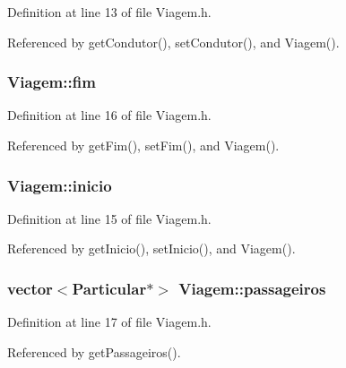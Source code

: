 Definition at line 13 of file Viagem.\+h.



Referenced by get\+Condutor(), set\+Condutor(), and Viagem().

\hypertarget{class_viagem_ab54e61d41be0157f9e75b14c8e06137f}{
\subsubsection[{fim}]{ Viagem\+::fim\hspace{0.3cm}{\ttfamily [private]}}}\label{class_viagem_ab54e61d41be0157f9e75b14c8e06137f}


Definition at line 16 of file Viagem.\+h.



Referenced by get\+Fim(), set\+Fim(), and Viagem().

\hypertarget{class_viagem_a0a871b6782ab9b478a530f2c15dc1e32}{
\subsubsection[{inicio}]{ Viagem\+::inicio\hspace{0.3cm}{\ttfamily [private]}}}\label{class_viagem_a0a871b6782ab9b478a530f2c15dc1e32}


Definition at line 15 of file Viagem.\+h.



Referenced by get\+Inicio(), set\+Inicio(), and Viagem().

\hypertarget{class_viagem_a8417361a46610f9fbbd6a7c43b02c149}{
\subsubsection[{passageiros}]{\setlength{\rightskip}{0pt plus 5cm}vector$<${\bf Particular}$\ast$$>$ Viagem\+::passageiros\hspace{0.3cm}{\ttfamily [private]}}}\label{class_viagem_a8417361a46610f9fbbd6a7c43b02c149}


Definition at line 17 of file Viagem.\+h.



Referenced by get\+Passageiros().

